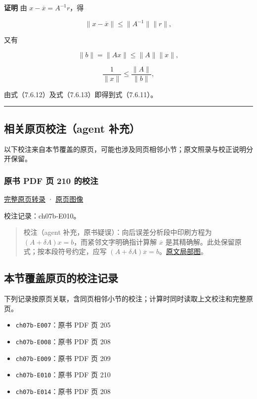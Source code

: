 \documentclass[
  10pt,
  fontset=fandol]{ctexart}
\providecommand{\tightlist}{%
  \setlength{\itemsep}{0pt}\setlength{\parskip}{0pt}}
\begin{document}
\textbf{证明} 由 \(x-\overline x=A^{-1}r\)，得

\[
\|x-\overline x\|\leqslant\|A^{-1}\|\|r\|,
\tag{7.6.12}
\]

又有

\[
\|b\|=\|Ax\|\leqslant\|A\|\|x\|,
\]

\[
\frac1{\|x\|}\leqslant\frac{\|A\|}{\|b\|},
\tag{7.6.13}
\]

由式（7.6.12）及式（7.6.13）即得到式（7.6.11）。

\begin{center}\rule{0.5\linewidth}{0.5pt}\end{center}

\subsection{相关原页校注（agent 补充）}\label{ux76f8ux5173ux539fux9875ux6821ux6ce8agent-ux8865ux5145}

以下校注来自本节覆盖的原页，可能也涉及同页相邻小节；原文照录与校正说明分开保留。

\subsubsection{原书 PDF 页 210 的校注}\label{ux539fux4e66-pdf-ux9875-210-ux7684ux6821ux6ce8}

\href{../pages/pdf-210.md}{完整原页转录} · \href{../../source-images/pdf-210.jpeg}{原页图像}

校注记录：ch07b-E010。

\begin{quote}
校注（agent 补充，原书疑误）：向后误差分析段中印刷方程为 \((A+\delta A)x=b\)，而紧邻文字明确指计算解 \(\overline x\) 是其精确解。此处保留原式；按本段符号约定，应写 \((A+\delta A)\overline x=b\)。\href{../assets/ch07b/210-backward-error.png}{原文局部图}。
\end{quote}

\subsection{本节覆盖原页的校注记录}\label{ux672cux8282ux8986ux76d6ux539fux9875ux7684ux6821ux6ce8ux8bb0ux5f55}

下列记录按原页关联，含同页相邻小节的校注；计算时同时读取上文校注和完整原页。

\begin{itemize}
\tightlist
\item
  \texttt{ch07b-E007}：原书 PDF 页 205
\item
  \texttt{ch07b-E008}：原书 PDF 页 208
\item
  \texttt{ch07b-E009}：原书 PDF 页 209
\item
  \texttt{ch07b-E010}：原书 PDF 页 210
\item
  \texttt{ch07b-E014}：原书 PDF 页 208
\end{itemize}
\end{document}
